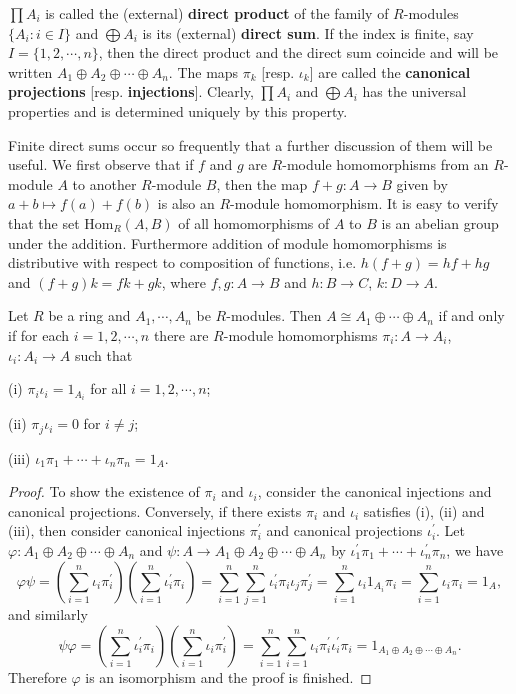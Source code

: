 $\prod A_i$ is called the (external) \textbf{direct product} of the family of $R$-modules $\{A_i:i\in I\}$ and $\bigoplus A_i$ is its (external) \textbf{direct sum}. If the index is finite, say $I=\{1,2,\cdots,n\}$, then the direct product and the direct sum coincide and will be written $A_1\oplus A_2\oplus\cdots\oplus A_n$. The maps $\pi_k$ [resp. $\iota_k$] are called the \textbf{canonical projections} [resp. \textbf{injections}]. Clearly, $\prod A_i$ and $\bigoplus A_i$ has the universal properties and is determined uniquely by this property.\par
Finite direct sums occur so frequently that a further discussion of them will be useful. We first observe that if $f$ and $g$ are $R$-module homomorphisms from an $R$-module $A$ to another $R$-module $B$, then the map $f+g:A\to B$ given by $a+b\mapsto f(a)+f(b)$ is also an $R$-module homomorphism. It is easy to verify that the set $\mathrm{Hom}_R(A,B)$ of all homomorphisms of $A$ to $B$ is an abelian group under the addition. Furthermore addition of module homomorphisms is distributive with respect to composition of functions, i.e. $h(f+g)=hf+hg$ and $(f+g)k=fk+gk$, where $f,g:A\to B$ and $h:B\to C$, $k:D\to A$.
\begin{theorem}
Let $R$ be a ring and $A_1,\cdots,A_n$ be $R$-modules. Then $A\cong A_1\oplus\cdots\oplus A_n$ if and only if for each $i=1,2,\cdots,n$ there are $R$-module homomorphisms $\pi_i:A\to A_i$, $\iota_i:A_i\to A$ such that \par
(i) $\pi_i\iota_i=1_{A_{i}}$ for all $i=1,2,\cdots,n$;\par
(ii) $\pi_j\iota_i=0$ for $i\ne j$;\par
(iii) $\iota_1\pi_1+\cdots+\iota_n\pi_n=1_A$.
\end{theorem}
\begin{proof}
To show the existence of $\pi_i$ and $\iota_i$, consider the canonical injections and canonical projections. Conversely, if there exists $\pi_i$ and $\iota_i$ satisfies (i), (ii) and (iii), then consider canonical injections $\pi_i^\prime$ and canonical projections $\iota_i^\prime$. Let $\varphi:A_1\oplus A_2\oplus\cdots\oplus A_n$ and $\psi:A\to A_1\oplus A_2\oplus\cdots\oplus A_n$ by $\iota_1^\prime\pi_1+\cdots+\iota_n^\prime\pi_n$, we have 
$$
\varphi \psi =\left( \sum_{i=1}^n{\iota _i\pi _{i}^{\prime}} \right) \left( \sum_{i=1}^n{\iota _{i}^{\prime}\pi _i} \right) =\sum_{i=1}^n{\sum_{j=1}^n{\iota _{i}^{\prime}\pi _i}\iota _j\pi _{j}^{\prime}}=\sum_{i=1}^n{\iota _i1_{A_i}\pi _i}=\sum_{i=1}^n{\iota _i\pi _i}=1_A,
$$
and similarly 
$$
\psi \varphi =\left( \sum_{i=1}^n{\iota _{i}^{\prime}\pi _i} \right) \left( \sum_{i=1}^n{\iota _i\pi _{i}^{\prime}} \right) =\sum_{i=1}^n{\sum_{i=1}^n{\iota _i\pi _{i}^{\prime}}\iota _{i}^{\prime}\pi _i}=1_{A_1\oplus A_2\oplus \cdots \oplus A_n}.
$$
Therefore $\varphi$ is an isomorphism and the proof is finished.
\end{proof}
